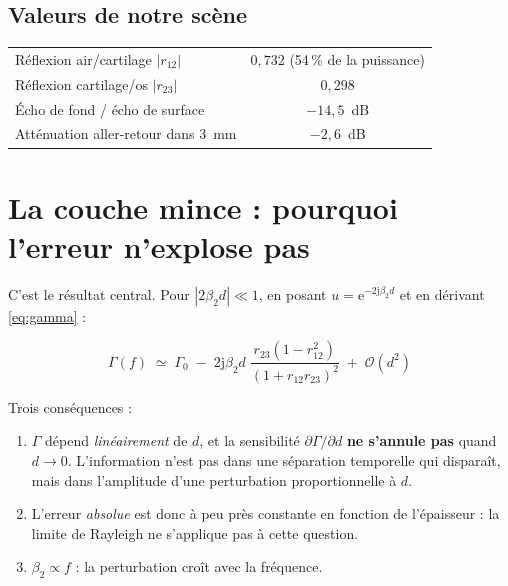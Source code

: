 \documentclass[11pt,a4paper]{article}
\newcommand{\ee}{\mathrm{e}}
\newcommand{\jj}{\mathrm{j}}
\begin{document}
\subsection{Valeurs de notre scène}

\begin{table}[h]
\centering
\begin{tabular}{lc}
\toprule
Réflexion air/cartilage $|r_{12}|$ & $0{,}732$ (54\,\% de la puissance) \\
Réflexion cartilage/os $|r_{23}|$  & $0{,}298$ \\
Écho de fond / écho de surface     & $-14{,}5$~dB \\
Atténuation aller-retour dans $3$~mm & $-2{,}6$~dB \\
\bottomrule
\end{tabular}
\end{table}

\section{La couche mince : pourquoi l'erreur n'explose pas}
\label{sec:couchemince}

C'est le résultat central. Pour $|2\beta_2 d| \ll 1$, en posant
$u = \ee^{-2\jj\beta_2 d}$ et en dérivant \eqref{eq:gamma} :

\begin{equation}
\boxed{\;
\Gamma(f) \;\simeq\; \Gamma_0
  \;-\; 2\jj\beta_2 d\;
  \frac{r_{23}\left(1 - r_{12}^{2}\right)}{\left(1 + r_{12}r_{23}\right)^{2}}
  \;+\; \mathcal{O}(d^{2})
\;}
\label{eq:mince}
\end{equation}

Trois conséquences :

\begin{enumerate}
\item $\Gamma$ dépend \emph{linéairement} de $d$, et la sensibilité
      $\partial\Gamma/\partial d$ \textbf{ne s'annule pas} quand $d\to0$.
      L'information n'est pas dans une séparation temporelle qui disparaît, mais
      dans l'amplitude d'une perturbation proportionnelle à $d$.
\item L'erreur \emph{absolue} est donc à peu près constante en fonction de
      l'épaisseur : la limite de Rayleigh ne s'applique pas à cette question.
\item $\beta_2 \propto f$ : la perturbation croît avec la fréquence.
\end{enumerate}
\end{document}
